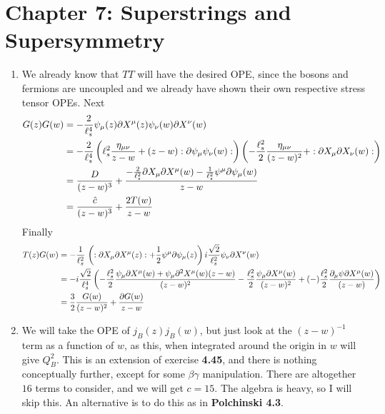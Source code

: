 \documentclass[11pt, class=article, crop=false]{standalone}
\begin{document}
\section*{Chapter 7: Superstrings and Supersymmetry} %
\label{sec:chapter_7_superstrings_and_supersymmetry}
\begin{enumerate}
	\item We already know that $T T$ will have the desired OPE, since the bosons and fermions are uncoupled and we already have shown their own respective stress tensor OPEs. Next
	\[
	\begin{aligned}
		G(z) G(w) &= - \frac{2}{\ell_s^4} \psi_\mu(z) \partial X^\mu(z) \psi_\nu(w) \partial X^\nu (w)\\ 
		&= - \frac{2}{\ell_s^4} \left(\ell_s^2 \frac{\eta_{\mu \nu}}{z-w} + (z-w) :\partial \psi_\mu \psi_\nu(w): \right) \left(-\frac{\ell_s^2}{2} \frac{\eta_{\mu \nu}}{(z-w)^2} + :\partial X_\mu \partial X_\nu (w): \right)\\
		&= \frac{D}{(z-w)^3} + \frac{-\frac{2}{\ell_s^2} \partial X_\mu \partial X^\mu (w) - \frac{1}{\ell_s^2} \psi^\mu \partial \psi_\mu (w)}{z-w} \\
		&= \frac{\hat c}{(z-w)^3} + \frac{2 T(w)}{z-w}
	\end{aligned}
	\]
	Finally
	\[
		\begin{aligned}
			T(z) G(w) &= - \frac{1}{\ell_s^2} \, \left(:\partial X_\mu \partial X^\mu (z): + \frac12 \psi^\mu \partial \psi_\mu (z)\right) i \frac{\sqrt 2}{\ell_s^2} \psi_\nu \partial X^\nu(w)\\
			&= -i \frac{\sqrt 2}{\ell_s^4} \left(-\frac{\ell_s^2}{2} \frac{ \psi_\mu \partial X^\mu (w) + \psi_\mu \partial^2 X^\mu(w) (z-w)}{(z-w)^2} - \frac{\ell_s^2}{2} \frac{ \psi_\mu \partial X^\mu (w)}{(z-w)^2} + (-) \frac{\ell_s^2}{2} \frac{\partial_\mu \psi \partial X^\mu(w)}{(z-w)} \right)\\
			&= \frac32 \frac{G(w)}{(z-w)^2} + \frac{\partial G(w)}{z-w}
		\end{aligned}
	\]
	
	\item We will take the OPE of $j_B(z) j_B(w)$, but just look at the $(z-w)^{-1}$ term as a function of $w$, as this, when integrated around the origin in $w$ will give $Q_B^2$. This is an extension of exercise \textbf{4.45}, and there is nothing conceptually further, except for some $\beta \gamma$ manipulation. There are altogether $16$ terms to consider, and we will get $c=15$. The algebra is heavy, so I will skip this. An alternative is to do this as in \textbf{Polchinski 4.3}.
	

\end{enumerate}
\end{document}
